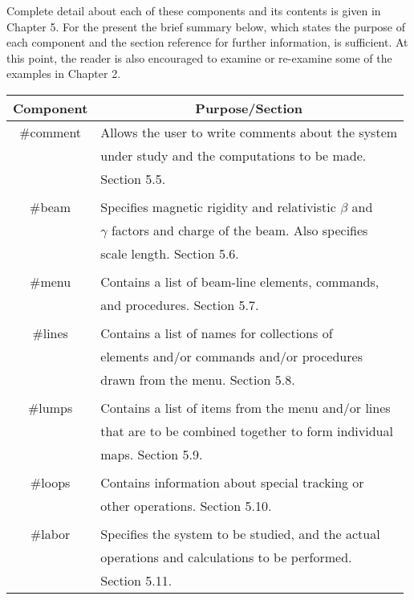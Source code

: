      Complete detail about each of these components and its contents is
given in Chapter 5.  For the present the brief summary below, which states
the purpose of each component and the section reference for further
information, is sufficient.  At this point, the reader is also encouraged
to examine or re-examine some of the examples in Chapter 2.       
\begin{center}
\begin{tabular}{|c|l|}   \hline
\multicolumn{1}{|c}{Component} &
\multicolumn{1}{|c|}{Purpose/Section} \\ \hline
   \#comment   &         Allows the user to write comments about the system \\
                &       under study and the computations to be made.  \\
                &       Section 5.5. \\
                & \\
     \#beam    &       Specifies magnetic rigidity and relativistic $\beta$ and  \\
                &       $\gamma$ factors and charge of the beam.  Also specifies  \\
                &       scale length.  Section 5.6. \\
                & \\
     \#menu    &       Contains a list of beam-line elements, commands,\\
                &      and procedures.  Section 5.7. \\
                & \\
    \#lines    &         Contains a list of names for collections of \\
                &       elements and/or commands and/or procedures \\
                &       drawn from the menu. Section 5.8. \\
                & \\
    \#lumps    &         Contains a list of items from the menu and/or lines \\
                &       that are to be combined together to form individual \\
                &       maps.  Section 5.9. \\
                & \\
    \#loops    &         Contains information about special tracking or \\
                &       other operations.  Section 5.10. \\
                & \\
    \#labor    &         Specifies the system to be studied, and the actual \\
                &       operations and calculations to be performed. \\
                &       Section 5.11.\\ \hline
\end{tabular}
\end{center}

